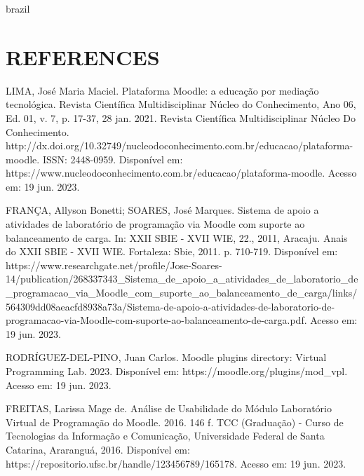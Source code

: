 

\begin{otherlanguage*}{brazil}

    \chapter{REFERENCES}

LIMA, José Maria Maciel. Plataforma Moodle: a educação por mediação tecnológica. Revista Científica Multidisciplinar Núcleo do Conhecimento, Ano 06, Ed. 01, v. 7, p. 17-37, 28 jan. 2021. Revista Científica Multidisciplinar Núcleo Do Conhecimento. http://dx.doi.org/10.32749/nucleodoconhecimento.com.br/educacao/plataforma-moodle. ISSN: 2448-0959. Disponível em: https://www.nucleodoconhecimento.com.br/educacao/plataforma-moodle. Acesso em: 19 jun. 2023.

FRANÇA, Allyson Bonetti; SOARES, José Marques. Sistema de apoio a atividades de laboratório de programação via Moodle com suporte ao balanceamento de carga. In: XXII SBIE - XVII WIE, 22., 2011, Aracaju. Anais do XXII SBIE - XVII WIE. Fortaleza: Sbie, 2011. p. 710-719. Disponível em: https://www.researchgate.net/profile/Jose-Soares-14/publication/268337343_Sistema_de_apoio_a_atividades_de_laboratorio_de_programacao_via_Moodle_com_suporte_ao_balanceamento_de_carga/links/564309dd08aeacfd8938a73a/Sistema-de-apoio-a-atividades-de-laboratorio-de-programacao-via-Moodle-com-suporte-ao-balanceamento-de-carga.pdf. Acesso em: 19 jun. 2023.

RODRÍGUEZ-DEL-PINO, Juan Carlos. Moodle plugins directory: Virtual Programming Lab. 2023. Disponível em: https://moodle.org/plugins/mod_vpl. Acesso em: 19 jun. 2023.

FREITAS, Larissa Mage de. Análise de Usabilidade do Módulo Laboratório Virtual de Programação do Moodle. 2016. 146 f. TCC (Graduação) - Curso de Tecnologias da Informação e Comunicação, Universidade Federal de Santa Catarina, Araranguá, 2016. Disponível em: https://repositorio.ufsc.br/handle/123456789/165178. Acesso em: 19 jun. 2023.


\end{otherlanguage*}
